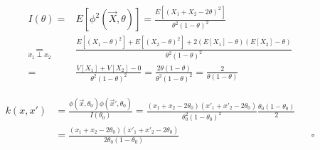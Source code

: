 \documentclass[11pt]{article}
\begin{document}
\begin{enumerate}
\begin{align*}
I(\theta)=&E[\phi^2(\vec X,\theta)]=\frac{E[(X_1+X_2-2\theta)^2]}{\theta^2(1-\theta)^2}\\
\underset{x_1\perp x_2}{=}&\frac{E[(X_1-\theta)^2]+E[(X_2-\theta)^2]+2(E[X_1]-\theta)(E[X_2]-\theta)}{\theta^2(1-\theta)^2}\\
=&\frac{V[X_1]+V[X_2]-0}{\theta^2(1-\theta)^2}=\frac{2\theta(1-\theta)}{\theta^2(1-\theta)^2}=\frac{2}{\theta(1-\theta)}
\end{align*}

\begin{align*}
k(x,x')&=\frac{\phi(\vec x,\theta_0)\phi(\vec x',\theta_0)}{I(\theta_0)}=\frac{(x_1+x_2-2\theta_0)(x'_1+x'_2-2\theta_0)}{\theta_0^2(1-\theta_0)^2}\frac{\theta_0(1-\theta_0)}2\\
&=\frac{(x_1+x_2-2\theta_0)(x'_1+x'_2-2\theta_0)}{2\theta_0(1-\theta_0)}&& \square
\end{align*}

\end{enumerate}
 


 
\end{document}
